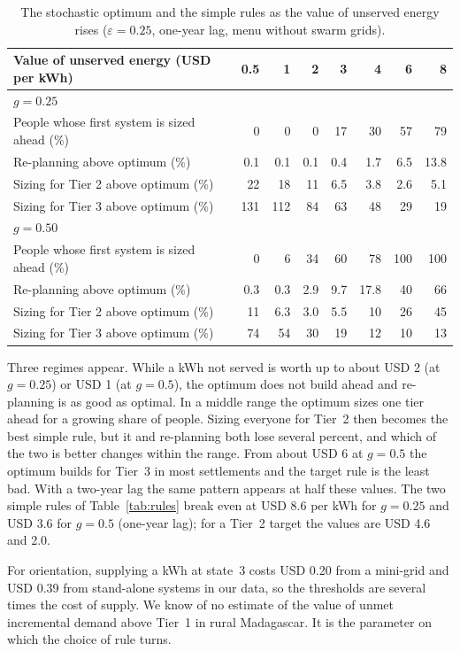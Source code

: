 \documentclass[11pt,a4paper]{article}
\begin{document}
\begin{table}[!ht]\centering\small
\caption{The stochastic optimum and the simple rules as the value of unserved energy rises
($\varepsilon=0.25$, one-year lag, menu without swarm grids).}\label{tab:voll}
\begin{tabular}{lrrrrrrr}\toprule
Value of unserved energy (USD per kWh) & 0.5 & 1 & 2 & 3 & 4 & 6 & 8\\\midrule
\multicolumn{8}{l}{$g=0.25$}\\
People whose first system is sized ahead (\%) & 0 & 0 & 0 & 17 & 30 & 57 & 79\\
Re-planning above optimum (\%) & 0.1 & 0.1 & 0.1 & 0.4 & 1.7 & 6.5 & 13.8\\
Sizing for Tier 2 above optimum (\%) & 22 & 18 & 11 & 6.5 & 3.8 & 2.6 & 5.1\\
Sizing for Tier 3 above optimum (\%) & 131 & 112 & 84 & 63 & 48 & 29 & 19\\\midrule
\multicolumn{8}{l}{$g=0.50$}\\
People whose first system is sized ahead (\%) & 0 & 6 & 34 & 60 & 78 & 100 & 100\\
Re-planning above optimum (\%) & 0.3 & 0.3 & 2.9 & 9.7 & 17.8 & 40 & 66\\
Sizing for Tier 2 above optimum (\%) & 11 & 6.3 & 3.0 & 5.5 & 10 & 26 & 45\\
Sizing for Tier 3 above optimum (\%) & 74 & 54 & 30 & 19 & 12 & 10 & 13\\\bottomrule
\end{tabular}
\end{table}

Three regimes appear. While a kWh not served is worth up to about USD 2 (at $g=0.25$) or USD 1 (at $g=0.5$),
the optimum does not build ahead and re-planning is as good as optimal. In a middle range the optimum sizes
one tier ahead for a growing share of people. Sizing everyone for Tier~2 then becomes the best simple rule, but
it and re-planning both lose several percent, and which of the two is better changes within the range. From about
USD 6 at $g=0.5$ the optimum builds for Tier~3 in most settlements and the target rule is the least bad. With a
two-year lag the same pattern appears at half these values. The two simple rules of Table~\ref{tab:rules} break
even at USD 8.6 per kWh for $g=0.25$ and USD 3.6 for $g=0.5$ (one-year lag); for a Tier~2 target the values are
USD 4.6 and 2.0.

For orientation, supplying a kWh at state~3 costs USD 0.20 from a mini-grid and USD 0.39 from stand-alone systems
in our data, so the thresholds are several times the cost of supply. We know of no estimate of the value of unmet
incremental demand above Tier~1 in rural Madagascar. It is the parameter on which the choice of rule turns.
\end{document}
